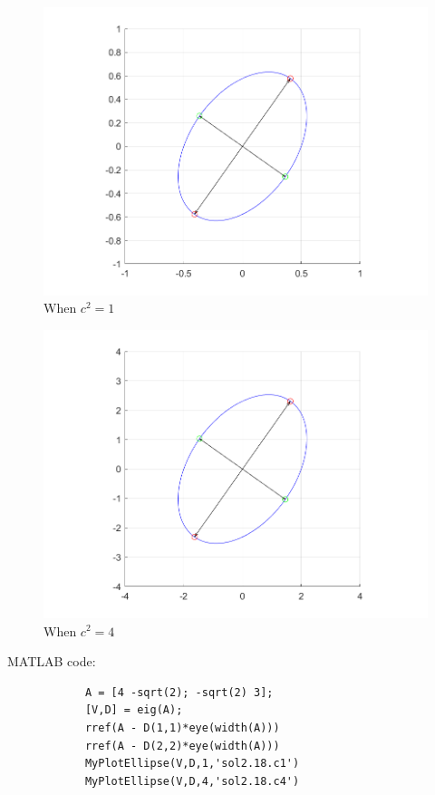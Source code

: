         \begin{figure}[H]
            \centering
            \includegraphics[scale=0.65]{./matlab/chapter-2/sol2.18.c1.png}
            \caption{When $c^2 = 1$}\label{fig:ellcis1}
        \end{figure}

        \begin{figure}[H]
            \centering
            \includegraphics[scale=0.65]{./matlab/chapter-2/sol2.18.c4.png}
            \caption{When $c^2 = 4$}\label{fig:ellcis4}
        \end{figure}

        MATLAB code:
        \begin{lstlisting}
            A = [4 -sqrt(2); -sqrt(2) 3];
            [V,D] = eig(A);
            rref(A - D(1,1)*eye(width(A)))
            rref(A - D(2,2)*eye(width(A)))
            MyPlotEllipse(V,D,1,'sol2.18.c1')
            MyPlotEllipse(V,D,4,'sol2.18.c4')
        \end{lstlisting}

